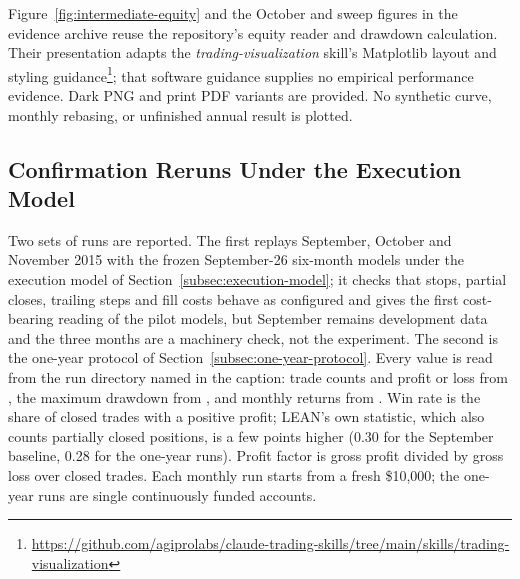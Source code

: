Figure~\ref{fig:intermediate-equity} and the October and sweep figures in the evidence archive reuse the repository's equity reader and drawdown calculation. Their presentation adapts the \textit{trading-visualization} skill's Matplotlib layout and styling guidance\footnote{\url{https://github.com/agiprolabs/claude-trading-skills/tree/main/skills/trading-visualization}}; that software guidance supplies no empirical performance evidence. Dark PNG and print PDF variants are provided. No synthetic curve, monthly rebasing, or unfinished annual result is plotted.

\subsection{Confirmation Reruns Under the Execution Model} \label{sec:confirmation-results}

Two sets of runs are reported. The first replays September, October and November 2015 with the frozen September-26 six-month models under the execution model of Section~\ref{subsec:execution-model}; it checks that stops, partial closes, trailing steps and fill costs behave as configured and gives the first cost-bearing reading of the pilot models, but September remains development data and the three months are a machinery check, not the experiment. The second is the one-year protocol of Section~\ref{subsec:one-year-protocol}. Every value is read from the run directory named in the caption: trade counts and profit or loss from , the maximum drawdown from , and monthly returns from . Win rate is the share of closed trades with a positive profit; LEAN's own  statistic, which also counts partially closed positions, is a few points higher (0.30 for the September baseline, 0.28 for the one-year runs). Profit factor is gross profit divided by gross loss over closed trades. Each monthly run starts from a fresh \$10,000; the one-year runs are single continuously funded accounts.

